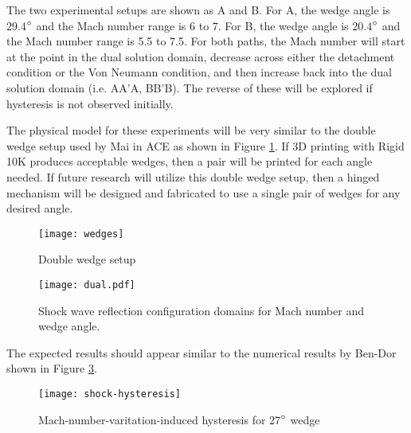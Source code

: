 The two experimental setups are shown as A and B. For A, the wedge angle is 29.4$\degree$ and the Mach number range is 6 to 7. For B, the wedge angle is 20.4$\degree$ and the Mach number range is 5.5 to 7.5. For both paths, the Mach number will start at the point in the dual solution domain, decrease across either the detachment condition or the Von Neumann condition, and then increase back into the dual solution domain (i.e. AA'A, BB'B). The reverse of these will be explored if hysteresis is not observed initially.

The physical model for these experiments will be very similar to the double wedge setup used by Mai in ACE as shown in Figure \ref{fig:wedges}. If 3D printing with Rigid 10K produces acceptable wedges, then a pair will be printed for each angle needed. If future research will utilize this double wedge setup, then a hinged mechanism will be designed and fabricated to use a single pair of wedges for any desired angle.

\begin{figure}[ht!]
    \centering
    \texttt{[image: wedges]}
    \caption[Double wedge setup]{Double wedge setup \cite{mai-dis}}
    \label{fig:wedges}
\end{figure}


\begin{figure}[ht!]
    \centering
    \texttt{[image: dual.pdf]}
    \caption{Shock wave reflection configuration domains for Mach number and wedge angle.}
    \label{fig:dual}
\end{figure}

The expected results should appear similar to the numerical results by Ben-Dor shown in Figure \ref{fig:shock-hysteresis}. 

\begin{figure}[ht!]
    \centering
    \texttt{[image: shock-hysteresis]}
    \caption[Mach-number-varitation-induced hysteresis for 27$\degree$ wedge]{Mach-number-varitation-induced hysteresis for 27$\degree$ wedge \cite{ben-dor-1}}
    \label{fig:shock-hysteresis}
\end{figure}



